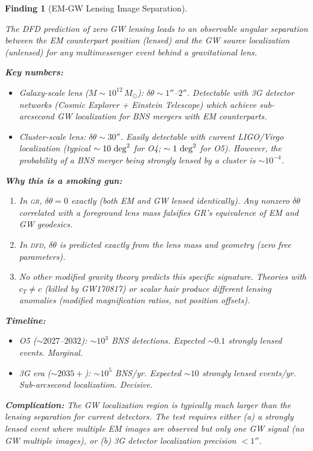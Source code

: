 \documentclass[11pt]{article}
\newtheorem{finding}{Finding}
\newcommand{\DFD}{\textsc{dfd}}
\newcommand{\GR}{\textsc{gr}}
\begin{document}
\begin{finding}[EM-GW Lensing Image Separation]\label{find:lensing-sep}

The DFD prediction of zero GW lensing leads to an observable angular
separation between the EM counterpart position (lensed) and the GW
source localization (unlensed) for any multimessenger event behind a
gravitational lens.

\textbf{Key numbers:}
\begin{itemize}[nosep]
\item Galaxy-scale lens ($M \sim 10^{12}\,M_\odot$): $\delta\theta
  \sim 1''$--$2''$. Detectable with 3G detector networks (Cosmic
  Explorer + Einstein Telescope) which achieve sub-arcsecond GW
  localization for BNS mergers with EM counterparts.
\item Cluster-scale lens: $\delta\theta \sim 30''$. Easily detectable
  with current LIGO/Virgo localization (typical $\sim 10~{\rm deg}^2$
  for O4; $\sim 1~{\rm deg}^2$ for O5). However, the probability of
  a BNS merger being strongly lensed by a cluster is $\sim 10^{-4}$.
\end{itemize}

\textbf{Why this is a smoking gun:}
\begin{enumerate}[nosep]
\item In \GR, $\delta\theta = 0$ exactly (both EM and GW lensed
  identically). \emph{Any} nonzero $\delta\theta$ correlated with
  a foreground lens mass falsifies GR's equivalence of EM and GW
  geodesics.
\item In \DFD, $\delta\theta$ is predicted exactly from the lens
  mass and geometry (zero free parameters).
\item No other modified gravity theory predicts this specific
  signature. Theories with $c_T \neq c$ (killed by GW170817) or
  scalar hair produce \emph{different} lensing anomalies (modified
  magnification ratios, not position offsets).
\end{enumerate}

\textbf{Timeline:}
\begin{itemize}[nosep]
\item O5 ($\sim 2027$--$2032$): $\sim 10^3$ BNS detections. Expected
  $\sim 0.1$ strongly lensed events. Marginal.
\item 3G era ($\sim 2035+$): $\sim 10^5$ BNS/yr. Expected $\sim 10$
  strongly lensed events/yr. Sub-arcsecond localization. Decisive.
\end{itemize}

\textbf{Complication:} The GW localization region is typically much
larger than the lensing separation for current detectors. The test
requires either (a) a strongly lensed event where multiple EM images
are observed but only one GW signal (no GW multiple images), or
(b) 3G detector localization precision $< 1''$.


\end{finding}
\end{document}
